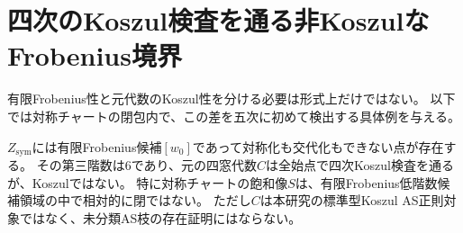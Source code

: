 \section{四次のKoszul検査を通る非KoszulなFrobenius境界}
\label{sec:nonkoszul-boundary}
有限Frobenius性と元代数のKoszul性を分ける必要は形式上だけではない。
以下では対称チャートの閉包内で、この差を五次に初めて検出する具体例を与える。

\begin{theorem}[有限Frobenius領域内の非対称化境界]\label{thm:nonkoszul-symmetric-boundary}
$Z_{\mathrm{sym}}$には有限Frobenius候補$[w_0]$であって対称化も交代化もできない点が存在する。
その第三階数は6であり、元の四窓代数$C$は全始点で四次Koszul検査を通るが、Koszulではない。
特に対称チャートの飽和像$S$は、有限Frobenius低階数候補領域の中で相対的に閉ではない。
ただし$C$は本研究の標準型Koszul AS正則対象ではなく、未分類AS枝の存在証明にはならない。
\end{theorem}
